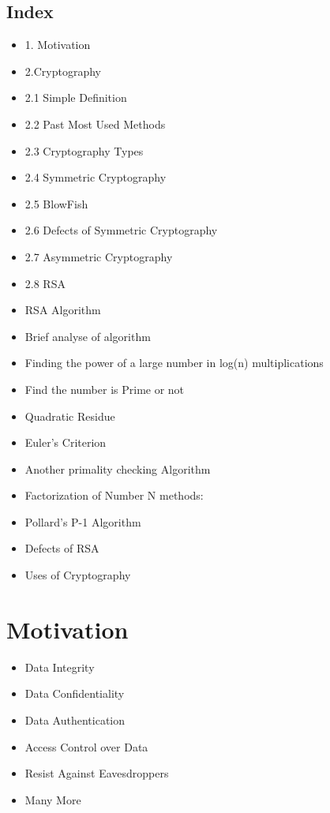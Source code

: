 \documentclass[12pt,a4paper]{report}
\begin{document}
\section*{Index}
\begin{itemize}
\item 1. Motivation
\item 2.Cryptography
\item 2.1 Simple Definition
\item 2.2 Past Most Used Methods
\item 2.3 Cryptography Types
\item 2.4 Symmetric Cryptography
\item 2.5 BlowFish
\item 2.6 Defects of Symmetric Cryptography
\item 2.7 Asymmetric Cryptography
\item 2.8 RSA
\item RSA Algorithm
\item Brief analyse of algorithm
\item Finding the power of a large number in log(n) multiplications
\item Find the number is Prime or not
\item Quadratic Residue
\item Euler's Criterion
\item Another primality checking Algorithm
\item Factorization of Number N methods:
\item Pollard's P-1 Algorithm
\item Defects of RSA
\item Uses of Cryptography

\end{itemize}
\newpage
\chapter{Motivation}
\begin{itemize}
\item Data Integrity
\item Data Confidentiality
\item Data Authentication
\item Access Control over Data
\item Resist Against Eavesdroppers
\item Many More
\end{itemize}

\begin{figure}[h]

\centering
\caption{}
\end{figure}
\end{document}
